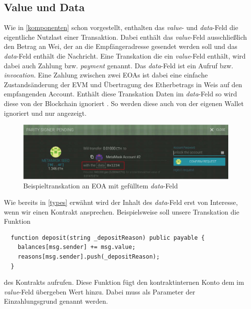 \documentclass[runningheads]{llncs}
\begin{document}
\subsection{Value und Data}
Wie in \ref{komponenten} schon vorgestellt, enthalten das \textit{value}- und \textit{data}-Feld die eigentliche Nutzlast einer Transaktion. Dabei enthält das \textit{value}-Feld ausschließlich den Betrag an Wei, der an die Empfängeradresse gesendet werden soll und das \textit{data}-Feld enthält die Nachricht.
Eine Transkation die ein \textit{value}-Feld enthält, wird dabei auch Zahlung bzw. \textit{payment} genannt. Das \textit{data}-Feld ist ein Aufruf bzw. \textit{invocation}\cite[S.108]{antonopoulos_mastering_2019}. Eine Zahlung zwischen zwei EOAs ist dabei eine einfache Zustandsänderung der EVM und Übertragung des Etherbetrags in Weis auf den empfangenden Account. Enthält diese Transkation Daten im \textit{data}-Feld so wird diese von der Blockchain ignoriert \cite[S.10]{wood_ethereum/yellowpaper_2019}. So werden diese auch von der eigenen Wallet ignoriert und nur angezeigt.
\begin{figure}[h!]
  \includegraphics[width=\textwidth, keepaspectratio]{dataTransaction.png}
  \caption{Beispieltranskation an EOA mit gefülltem \textit{data}-Feld \cite[S.109]{antonopoulos_mastering_2019}}
\end{figure}

Wie bereits in \ref{types} erwähnt wird der Inhalt des \textit{data}-Feld erst von Interesse, wenn wir einen Kontrakt ansprechen.
Beispielsweise soll unsere Transkation die Funktion \\
\begin{verbatim}
  function deposit(string _depositReason) public payable {
    balances[msg.sender] += msg.value;
    reasons[msg.sender].push(_depositReason);
  }
\end{verbatim}
des Kontrakts aufrufen. Diese Funktion fügt den kontraktinternen Konto dem im \textit{value}-Feld übergeben Wert hinzu. Dabei muss als Parameter der Einzahlungsgrund genannt werden.
\end{document}
